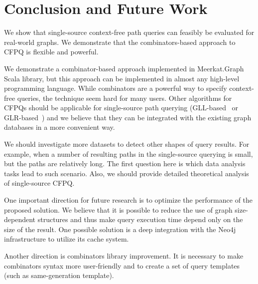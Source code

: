 \section{Conclusion and Future Work}

We show that single-source context-free path queries can feasibly be evaluated for real-world graphs.
We demonstrate that the combinators-based approach to CFPQ is flexible and powerful.

We demonstrate a combinator-based approach implemented in Meerkat.Graph Scala library, but this approach can be implemented in almost any high-level programming language.
While combinators are a powerful way to specify context-free queries, the technique seem hard for many users.
Other algorithms for CFPQs should be applicable for single-source path querying (GLL-based~\cite{Grigorev:2017:CPQ:3166094.3166104, MEDEIROS201975} or GLR-based~\cite{10.1007/978-3-319-41579-6_22, 10.1007/978-3-319-91662-0_17}) and we believe that they can be integrated with the existing graph databases in a more convenient way.

We should investigate more datasets to detect other shapes of query results.
For example, when a number of resulting paths in the single-source querying is small, but the paths are relatively long.
The first question here is which data analysis tasks lead to such scenario.
Also, we should provide detailed theoretical analysis of single-source CFPQ.

One important direction for future research is to optimize the performance of the proposed solution.
We believe that it is possible to reduce the use of graph size-dependent structures and thus make query execution time depend only on the size of the result.
One possible solution is a deep integration with the Neo4j infrastructure to utilize its cache system.

Another direction is combinators library improvement.
It is necessary to make combinators syntax more user-friendly and to create a set of query templates (such as same-generation template).